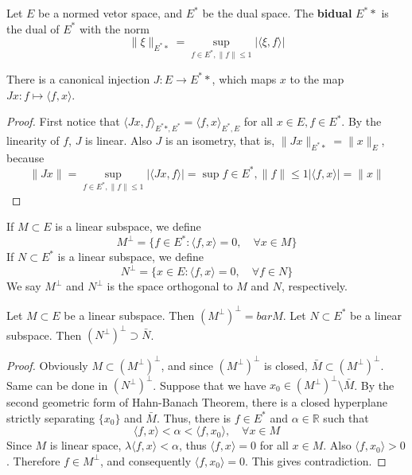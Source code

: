 \begin{defn} Let $E$ be a normed vetor space, and $E^*$ be the dual space. The \textbf{bidual} $E^**$ is the dual of $E^*$ with the norm
\begin{equation}
\|\xi\|_{E^**}=\sup_{f\in E^*,\|f\|\leq 1}|\langle \xi,f\rangle|
\end{equation}
\end{defn}

\begin{prop} There is a canonical injection $J:E\rightarrow E^**$, which maps $x$ to the map $Jx:f\mapsto \langle f,x\rangle$.
\end{prop}
\begin{proof}
First notice that $\langle Jx,f\rangle_{E^**,E^*}=\langle f,x\rangle_{E^*,E}$ for all $x\in E, f\in E^*$. By the linearity of $f$, $J$ is linear. Also $J$ is an isometry, that is, $\|Jx\|_{E^**}=\|x\|_E$, because
\begin{equation}
\|Jx\|=\sup_{f\in E^*,\|f\|\leq 1}|\langle Jx,f\rangle|=\sup{f\in E^*,\|f\|\leq 1}|\langle f,x\rangle|=\|x\|
\end{equation}
\end{proof}

\begin{defn} If $M\subset E$ is a linear subspace, we define
\begin{equation}
M^\perp =\{f\in E^*:\langle f,x\rangle=0,\quad \forall x\in M\}
\end{equation}
If $N\subset E^*$ is a linear subspace, we define
\begin{equation}
N^\perp = \{x\in E:\langle f,x\rangle=0,\quad \forall f\in N\}
\end{equation}
We say $M^\perp$ and $N^\perp$ is the space orthogonal to $M$ and $N$, respectively.
\end{defn}

\begin{prop} Let $M\subset E$ be a linear subspace. Then $(M^\perp)^\perp=bar{M}$. Let $N\subset E^*$ be a linear subspace. Then $(N^\perp)^\perp \supset \bar{N}$.
\end{prop}
\begin{proof}
Obviously $M\subset (M^\perp)^\perp$, and since $(M^\perp)^\perp$ is closed, $\bar{M}\subset (M^\perp)^\perp$. Same can be done in $(N^\perp)^\perp$. Suppose that we have $x_0\in (M^\perp)^\perp\setminus \bar{M}$. By the second geometric form of Hahn-Banach Theorem, there is a closed hyperplane strictly separating $\{x_0\}$ and $\bar{M}$. Thus, there is $f\in E^*$ and $\alpha\in \mathbb{R}$ such that
\begin{equation}
\langle f,x\rangle <\alpha<\langle f,x_0\rangle,\quad \forall x\in M
\end{equation}
Since $M$ is linear space, $\lambda \langle f,x\rangle<\alpha$, thus $\langle f,x\rangle=0$ for all $x\in M$. Also $\langle f,x_0\rangle>0$. Therefore $f\in M^\perp$, and consequently $\langle f,x_0\rangle=0$. This gives contradiction.
\end{proof}

